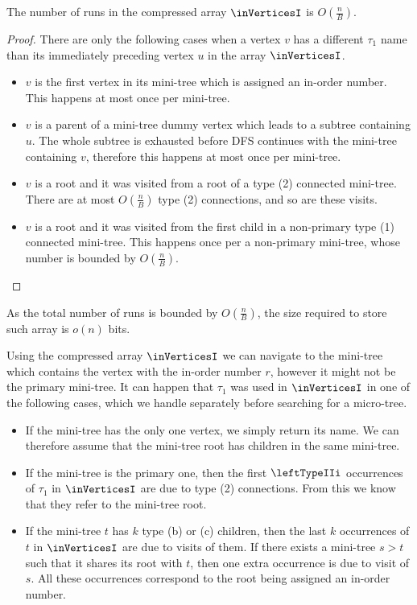 \begin{lemma}
	The number of runs in the compressed array $\inVerticesI$ is $O\left(\frac{n}{B}\right)$.
\end{lemma}
\begin{proof}
	There are only the following cases when a vertex $v$ has a different $\tau_1$ name than its immediately preceding vertex $u$ in the array $\inVerticesI$.
	\begin{itemize}
		\item $v$ is the first vertex in its mini-tree which is assigned an in-order number.
		This happens at most once per mini-tree.

		\item $v$ is a parent of a mini-tree dummy vertex which leads to a subtree containing $u$.
		The whole subtree is exhausted before DFS continues with the mini-tree containing $v$, therefore this happens at most once per mini-tree.

		\item $v$ is a root and it was visited from a root of a type (2) connected mini-tree.
		There are at most $O\left(\frac{n}{B}\right)$ type (2) connections, and so are these visits.
		
		\item $v$ is a root and it was visited from the first child in a non-primary type (1) connected mini-tree.
		This happens once per a non-primary mini-tree, whose number is bounded by $O\left(\frac{n}{B}\right)$.
	\end{itemize}
\end{proof}

As the total number of runs is bounded by $O\left(\frac{n}{B}\right)$, the size required to store such array is $o(n)$ bits.

Using the compressed array $\inVerticesI$ we can navigate to the mini-tree which contains the vertex with the in-order number $r$, however it might not be the primary mini-tree.
It can happen that $\tau_1$ was used in $\inVerticesI$ in one of the following cases, which we handle separately before searching for a micro-tree.
\begin{itemize}
	\item If the mini-tree has the only one vertex, we simply return its name.
	We can therefore assume that the mini-tree root has children in the same mini-tree.
	
	\item If the mini-tree is the primary one, then the first $\leftTypeIIi$ occurrences of $\tau_1$ in $\inVerticesI$ are due to type (2) connections.
	From this we know that they refer to the mini-tree root.

	\item If the mini-tree $t$ has $k$ type (b) or (c) children, then the last $k$ occurrences of $t$ in $\inVerticesI$ are due to visits of them.
	If there exists a mini-tree $s > t$ such that it shares its root with $t$, then one extra occurrence is due to visit of $s$.
	All these occurrences correspond to the root being assigned an in-order number.
\end{itemize}

